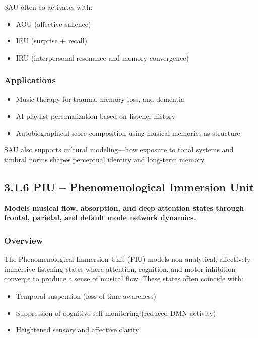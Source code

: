 \documentclass[10pt]{article}
\begin{document}
SAU often co-activates with:

\begin{itemize}
    \item AOU (affective salience)
    \item IEU (surprise + recall)
    \item IRU (interpersonal resonance and memory convergence)
\end{itemize}

\subsubsection*{Applications}

\begin{itemize}
    \item Music therapy for trauma, memory loss, and dementia
    \item AI playlist personalization based on listener history
    \item Autobiographical score composition using musical memories as structure
\end{itemize}

SAU also supports cultural modeling—how exposure to tonal systems and timbral norms shapes perceptual identity and long-term memory.

\subsection*{3.1.6 PIU – Phenomenological Immersion Unit}

\textbf{Models musical flow, absorption, and deep attention states through frontal, parietal, and default mode network dynamics.}

\subsubsection*{Overview}

The Phenomenological Immersion Unit (PIU) models non-analytical, affectively immersive listening states where attention, cognition, and motor inhibition converge to produce a sense of musical flow. These states often coincide with:

\begin{itemize}
    \item Temporal suspension (loss of time awareness)
    \item Suppression of cognitive self-monitoring (reduced DMN activity)
    \item Heightened sensory and affective clarity
\end{itemize}
\end{document}

